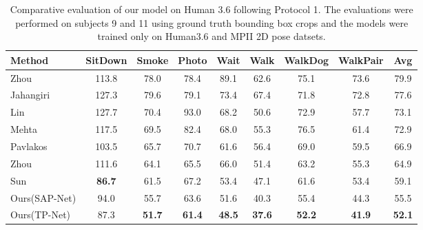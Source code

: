 \documentclass[runningheads]{llncs}
\begin{document}
\begin{table*}[t]
\begin{tabular}{l  c  c  c  c  c  c  c  c }
\hline
\hline
Method & SitDown & Smoke & Photo & Wait & Walk & WalkDog & WalkPair & Avg \\
\hline
\hline
Zhou~\cite{zhou2016sparseness} & 113.8 & 78.0 & 78.4 & 89.1 & 62.6 & 75.1 & 73.6 & 79.9 \\
Jahangiri~\cite{Jahangiri:ICCV2017} & 127.3 & 79.6 & 79.1 & 73.4 & 67.4 & 71.8 & 72.8 & 77.6 \\
Lin~\cite{Lin_2017_CVPR} & 127.7 & 70.4 & 93.0 & 68.2 & 50.6 & 72.9 & 57.7 & 73.1 \\
Mehta~\cite{mono-3dhp2017} & 117.5 & 69.5 & 82.4 & 68.0 & 55.3 & 76.5 & 61.4 & 72.9 \\
Pavlakos~\cite{Pavlakos_2017_CVPR} & 103.5 & 65.7 & 70.7 & 61.6 & 56.4 & 69.0 & 59.5 & 66.9 \\
Zhou~\cite{Zhou_2017_ICCV}& 111.6 & 64.1 & 65.5 & 66.0 & 51.4 & 63.2 & 55.3 & 64.9 \\
Sun~\cite{Sun_2017_ICCV}& \textbf{86.7} & 61.5 & 67.2 & 53.4 & 47.1 & 61.6 & 53.4 & 59.1 \\
\hline
Ours(SAP-Net) & 94.0 & 55.7 & 63.6 & 51.6 & 40.3 & 55.4 & 44.3 & 55.5 \\
Ours(TP-Net) & 87.3 & \textbf{51.7} & \textbf{61.4} & \textbf{48.5} & \textbf{37.6} & \textbf{52.2} & \textbf{41.9} & \textbf{52.1} \\
\hline
\end{tabular}
\vskip 2mm
\caption{Comparative evaluation of our model on Human 3.6 following Protocol 1. The evaluations were performed on subjects 9 and 11 using ground truth bounding box crops and the models were trained only on Human3.6 and MPII 2D pose datsets.} \label{tab: h36mp1}
\vspace{-2em}
\end{table*}
\end{document}
